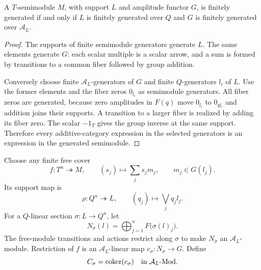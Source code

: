\begin{proposition}\label{prop:ringoid-finite}
A $T$-semimodule $M$, with support $L$ and amplitude functor $G$, is
finitely generated if and only if $L$ is finitely generated over $Q$
and $G$ is finitely generated over $\mathcal A_L$.
\end{proposition}
\begin{proof}
The supports of finite semimodule generators generate $L$. The same
elements generate $G$: each scalar multiple is a scalar arrow, and a
sum is formed by transitions to a common fiber followed by group addition.

Conversely choose finite $\mathcal A_L$-generators of $G$ and finite
$Q$-generators $l_i$ of $L$. Use the former elements and the fiber zeros
$0_{l_i}$ as semimodule generators. All fiber zeros are generated, because
zero amplitudes in $F(q)$ move $0_{l_i}$ to $0_{ql_i}$ and addition joins
their supports. A transition to a larger fiber is realized by adding its
fiber zero. The scalar $-1_T$ gives the group inverse at the same
support. Therefore every additive-category expression in the selected
generators is an expression in the generated semimodule.
\end{proof}

Choose any finite free cover
\[
 f:T^n\twoheadrightarrow M,\qquad
 (s_j)\longmapsto\sum_j s_jm_j,
 \qquad m_j\in G(l_j).
\]
Its support map is
\[
 \rho:Q^n\twoheadrightarrow L,\qquad
 (q_j)\longmapsto\bigvee_jq_jl_j.
\]
For a $Q$-linear section $\sigma:L\to Q^n$, let
\[
 N_\sigma(l)=\bigoplus_{j=1}^nF\bigl(\sigma(l)_j\bigr).
\]
The free-module transitions and actions restrict along $\sigma$ to make
$N_\sigma$ an $\mathcal A_L$-module. Restriction of $f$ is an
$\mathcal A_L$-linear map $c_\sigma:N_\sigma\to G$. Define
\[
 C_\sigma=\operatorname{coker}(c_\sigma)
 \quad\text{in }\mathcal A_L\text{-}\mathrm{Mod}.
\]

